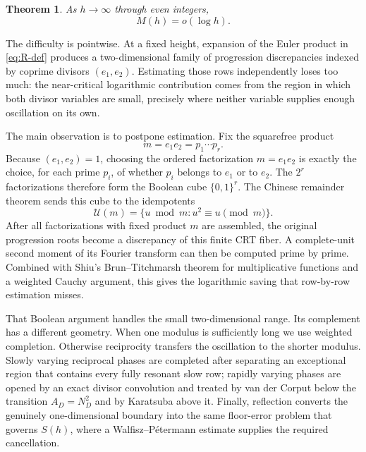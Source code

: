 \documentclass[11pt]{article}
\newtheorem{theorem}{Theorem}[section]
\theoremstyle{definition}
\theoremstyle{remark}
\newcommand{\1}{\mathbf 1}
\begin{document}
\begin{theorem}\label{thm:main}
As $h\to\infty$ through even integers,
\[
M(h)=o(\log h).
\]
\end{theorem}

The difficulty is pointwise.  At a fixed height, expansion of the Euler product in \cref{eq:R-def} produces a two-dimensional family of progression discrepancies indexed by coprime divisors $(e_1,e_2)$.  Estimating those rows independently loses too much: the near-critical logarithmic contribution comes from the region in which both divisor variables are small, precisely where neither variable supplies enough oscillation on its own.

The main observation is to postpone estimation.  Fix the squarefree product
\[
m=e_1e_2=p_1\cdots p_r.
\]
Because $(e_1,e_2)=1$, choosing the ordered factorization $m=e_1e_2$ is exactly the choice, for each prime $p_i$, of whether $p_i$ belongs to $e_1$ or to $e_2$.  The $2^r$ factorizations therefore form the Boolean cube $\{0,1\}^r$.  The Chinese remainder theorem sends this cube to the idempotents
\[
\mathcal U(m)=\{u\bmod m:u^2\equiv u\pmod m\}.
\]
After all factorizations with fixed product $m$ are assembled, the original progression roots become a discrepancy of this finite CRT fiber.  A complete-unit second moment of its Fourier transform can then be computed prime by prime.  Combined with Shiu's Brun--Titchmarsh theorem for multiplicative functions and a weighted Cauchy argument, this gives the logarithmic saving that row-by-row estimation misses.

That Boolean argument handles the small two-dimensional range.  Its complement has a different geometry.  When one modulus is sufficiently long we use weighted completion.  Otherwise reciprocity transfers the oscillation to the shorter modulus.  Slowly varying reciprocal phases are completed after separating an exceptional region that contains every fully resonant slow row; rapidly varying phases are opened by an exact divisor convolution and treated by van der Corput below the transition $A_D=N_D^2$ and by Karatsuba above it.  Finally, reflection converts the genuinely one-dimensional boundary into the same floor-error problem that governs $S(h)$, where a Walfisz--P\'etermann estimate supplies the required cancellation.
\end{document}
